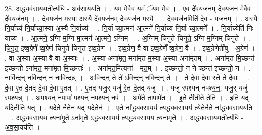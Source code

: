 \documentclass[17pt]{extarticle}
\begin{document}
28. अ॒द्ध्यव॑सायय॒तीत्य॑धि - अव॑साययति । . य॒म मे॒वैव य॒मं ॅय॒म मे॒व । . ए॒व दे॑व॒यज॑नम् देव॒यज॑न मे॒वैव दे॑व॒यज॑नम् । . दे॒व॒यज॑न म॒स्या अ॒स्यै दे॑व॒यज॑नम् देव॒यज॑न म॒स्यै । . दे॒व॒यज॑न॒मिति॑ देव - यज॑नम् । . अ॒स्यै नि॒र्याच्य॑ नि॒र्याच्या॒स्या अ॒स्यै नि॒र्याच्य॑ । . नि॒र्या च्या॒त्मन॑ आ॒त्मने॑ नि॒र्याच्य॑ नि॒र्या च्या॒त्मने᳚ । . नि॒र्याच्येति॑ निः - याच्य॑ । . आ॒त्मने॒ ऽग्नि म॒ग्नि मा॒त्मन॑ आ॒त्मने॒ ऽग्निम् । . अ॒ग्निम् चि॑नुते चिनुते॒ ऽग्नि म॒ग्निम् चि॑नुते । . चि॒नु॒त॒ इ॒ष्व॒ग्रेणे᳚ ष्व॒ग्रेण॑ चिनुते चिनुत इष्व॒ग्रेण॑ । . इ॒ष्व॒ग्रेण॒ वै वा इ॑ष्व॒ग्रेणे᳚ ष्व॒ग्रेण॒ वै । . इ॒ष्व॒ग्रेणेती॑षु - अ॒ग्रेण॑ । . वा अ॒स्या अ॒स्या वै वा अ॒स्याः । . अ॒स्या अना॑मृत॒ मना॑मृत म॒स्या अ॒स्या अना॑मृतम् । . अना॑मृत मि॒च्छन्त॑ इ॒च्छन्तो ऽना॑मृत॒ मना॑मृत मि॒च्छन्तः॑ । . अना॑मृत॒मित्यना᳚ - मृ॒त॒म् । . इ॒च्छन्तो॒ न ने च्छन्त॑ इ॒च्छन्तो॒ न । . नावि॑न्दन् नविन्द॒न् न नावि॑न्दन्न् । . अ॒वि॒न्द॒न् ते ते॑ ऽविन्दन् नविन्द॒न् ते । . ते दे॒वा दे॒वा स्ते ते दे॒वाः । . दे॒वा ए॒त दे॒तद् दे॒वा दे॒वा ए॒तत् । . ए॒तद् यजु॒र् यजु॑ रे॒त दे॒तद् यजुः॑ । . यजु॑ रपश्यन् नपश्य॒न्॒. यजु॒र् यजु॑ रपश्यन्न् । . अ॒प॒श्य॒न् नपापा॑ पश्यन् नपश्य॒न् नप॑ । . अपे॑ते॒ तापापे॑त । . इ॒ते तीती॑ते॒ तेति॑ । . इति॒ यद् यदितीति॒ यत् । . यदे॒ते नै॒तेन॒ यद् यदे॒तेन॑ । . ए॒ते ना᳚द्ध्यवसा॒यय॑ त्यद्ध्यवसा॒यय॑ त्ये॒तेनै॒ते ना᳚द्ध्यवसा॒यय॑ति । . अ॒द्ध्य॒व॒सा॒यय॒ त्यना॑मृ॒ते ऽना॑मृते ऽद्ध्यवसा॒यय॑ त्यद्ध्यवसा॒यय॒ त्यना॑मृते । . अ॒द्ध्य॒व॒सा॒यय॒तीत्य॑धि - अ॒व॒सा॒यय॑ति । \newline
\end{document}
